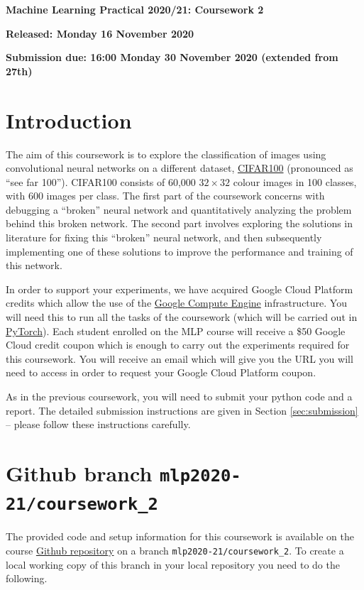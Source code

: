 \documentclass[11pt,]{article}
\begin{document}
\begin{center}
\textsf{\textbf{\Large Machine Learning Practical 2020/21: Coursework 2}}

\bigskip
\textbf{Released: Monday 16 November 2020}

\textbf{Submission due: 16:00 Monday 30 November 2020 (extended from 27th)}
\end{center}
\section{Introduction}
\label{sec:introduction}

The aim of this coursework is to explore the classification of images using convolutional neural networks on a different dataset, \href{https://www.cs.toronto.edu/~kriz/cifar.html}{CIFAR100} (pronounced as ``see far 100''). CIFAR100 consists of 60,000 $32 \times 32$ colour images in 100 classes, with 600 images per class. The first part of the coursework concerns with debugging a ``broken'' neural network and quantitatively analyzing the problem behind this broken network. The second part involves exploring the solutions in literature for fixing this ``broken'' neural network, and then subsequently implementing one of these solutions to improve the performance and training of this network. 

In order to support your experiments, we have acquired Google Cloud Platform credits which allow the use of the  \href{https://cloud.google.com/compute/docs/}{Google Compute Engine} infrastructure.
You will need this to run all the tasks of the coursework (which will be carried out in \href{https://pytorch.org}{PyTorch}). Each student enrolled on the MLP course will receive a \$50 Google Cloud credit coupon which is enough to carry out the experiments required for this coursework. You will receive an email which will give you the URL you will need to access in order to request your Google Cloud Platform coupon. 

As in the previous coursework, you will need to submit your python code and a report. The detailed submission instructions are given in Section \ref{sec:submission} -- please follow these instructions carefully.

\section{Github branch \texttt{mlp2020-21/coursework\_2}}
\label{sec:code}

The provided code and setup information for this coursework is available on the course
\href{https://github.com/VICO-UoE/mlpractical}{Github repository}
on a branch \verb+mlp2020-21/coursework_2+. To create a local working
copy of this branch in your local repository you need to do the
following.
\end{document}
